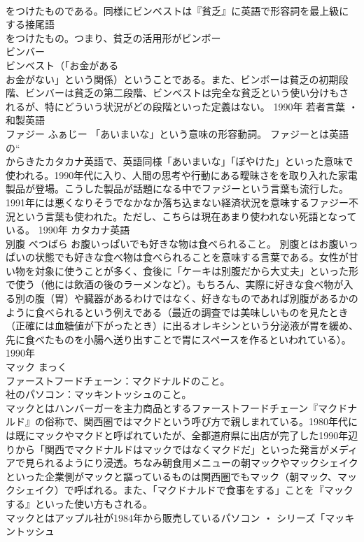 \documentclass[8pt]{extreport}
\begin{document}
\begin{CJK}{UTF8}{min}
\\	をつけたものである。同様にビンベストは『貧乏』に英語で形容詞を最上級にする接尾語
\\	をつけたもの。つまり、貧乏の活用形がビンボー
\\	ビンバー
\\	ビンベスト（「お金がある
\\	お金がない」という関係）ということである。また、ビンボーは貧乏の初期段階、ビンバーは貧乏の第二段階、ビンベストは完全な貧乏という使い分けもされるが、特にどういう状況がどの段階といった定義はない。	1990年	若者言葉 ・ 和製英語	
\\	ファジー	ふぁじー	「あいまいな」という意味の形容動詞。	ファジーとは英語の“
\\	からきたカタカナ英語で、英語同様「あいまいな」「ぼやけた」といった意味で使われる。1990年代に入り、人間の思考や行動にある曖昧さをを取り入れた家電製品が登場。こうした製品が話題になる中でファジーという言葉も流行した。1991年には悪くなりそうでなかなか落ち込まない経済状況を意味するファジー不況という言葉も使われた。ただし、こちらは現在あまり使われない死語となっている。	1990年	カタカナ英語	
\\	別腹	べつばら	お腹いっぱいでも好きな物は食べられること。	別腹とはお腹いっぱいの状態でも好きな食べ物は食べられることを意味する言葉である。女性が甘い物を対象に使うことが多く、食後に「ケーキは別腹だから大丈夫」といった形で使う（他には飲酒の後のラーメンなど）。もちろん、実際に好きな食べ物が入る別の腹（胃）や臓器があるわけではなく、好きなものであれば別腹があるかのように食べられるという例えである（最近の調査では美味しいものを見たとき（正確には血糖値が下がったとき）に出るオレキシンという分泌液が胃を緩め、先に食べたものを小腸へ送り出すことで胃にスペースを作るといわれている）。	1990年	
\\	マック	まっく	
\\	ファーストフードチェーン：マクドナルドのこと。 
\\	社のパソコン：マッキントッシュのこと。	
\\	マックとはハンバーガーを主力商品とするファーストフードチェーン『マクドナルド』の俗称で、関西圏ではマクドという呼び方で親しまれている。1980年代には既にマックやマクドと呼ばれていたが、全都道府県に出店が完了した1990年辺りから「関西でマクドナルドはマックではなくマクドだ」といった発言がメディアで見られるようにり浸透。ちなみ朝食用メニューの朝マックやマックシェイクといった企業側がマックと謳っているものは関西圏でもマック（朝マック、マックシェイク）で呼ばれる。また、「マクドナルドで食事をする」ことを『マックする』といった使い方もされる。 
\\	マックとはアップル社が1984年から販売しているパソコン ・ シリーズ「マッキントッシュ

\end{CJK}
\end{document}
